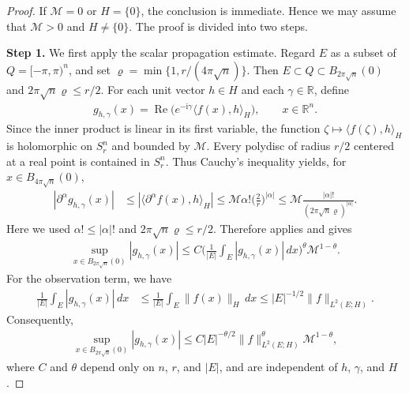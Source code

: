 \documentclass[10pt,a4paper]{amsart}
\theoremstyle{plain}
\theoremstyle{remark}
\theoremstyle{definition}
\theoremstyle{plain}
\begin{document}
\begin{proof}
If \(\mathcal M=0\) or \(H=\{0\}\), the conclusion is immediate. Hence we may assume that \(\mathcal M>0\) and \(H\ne\{0\}\). The proof is divided into two steps.

\smallskip

\textbf{Step 1.} We first apply the scalar propagation estimate.
Regard \(E\) as a subset of \(Q=[-\pi,\pi)^n\), and set \(\varrho=\min\{1,r/(4\pi\sqrt n)\}\). Then
\(E\subset Q\subset B_{2\pi\sqrt n}(0)\) and \(2\pi\sqrt n\varrho \le r/2\).
For each unit vector \(h\in H\) and each \(\gamma\in\mathbb R\), define
\begin{align*}
g_{h,\gamma}(x)
=\operatorname{Re}\bigl(e^{-\mathrm{i}\gamma}\langle f(x),h\rangle_H\bigr),
\qquad x\in\mathbb R^n.
\end{align*}
Since the inner product is linear in its first variable, the function
\(\zeta\mapsto\langle f(\zeta),h\rangle_H\) is holomorphic on \(S_r^n\) and bounded by \(\mathcal M\).
Every polydisc of radius \(r/2\) centered at a real point is contained in \(S_r^n\).
Thus Cauchy's inequality yields, for \(x\in B_{4\pi\sqrt n}(0)\),
\begin{align*}
|\partial^\alpha g_{h,\gamma}(x)|
&\leq |\langle \partial^\alpha f(x),h\rangle_H|
\leq \mathcal M\alpha!\biggl(\frac2r\biggr)^{|\alpha|}
\leq \mathcal M\frac{|\alpha|!}{(2\pi\sqrt n\varrho )^{|\alpha|}}.
\end{align*}
Here we used \(\alpha!\le|\alpha|!\) and \(2\pi\sqrt n\varrho \le r/2\).
Therefore  applies and gives
\begin{align*}
\sup_{x\in B_{2\pi\sqrt n}(0)}|g_{h,\gamma}(x)|
\leq C\biggl(\frac1{|E|}\int_E|g_{h,\gamma}(x)|\,dx\biggr)^\theta
\mathcal M^{1-\theta}.
\end{align*}
For the observation term, we have
\begin{align*}
\frac1{|E|}\int_E|g_{h,\gamma}(x)|\,dx
&\leq\frac1{|E|}\int_E\|f(x)\|_H\,dx
\leq |E|^{-1/2}\|f\|_{L^2(E;H)}.
\end{align*}
Consequently,
\begin{align*}
\sup_{x\in B_{2\pi\sqrt n}(0)}|g_{h,\gamma}(x)|
\leq C|E|^{-\theta/2}
\|f\|_{L^2(E;H)}^\theta\mathcal M^{1-\theta},
\end{align*}
where \(C\) and \(\theta\) depend only on \(n\), \(r\), and \(|E|\), and are independent of \(h\), \(\gamma\), and \(H\).

\smallskip


\end{proof}
\end{document}
